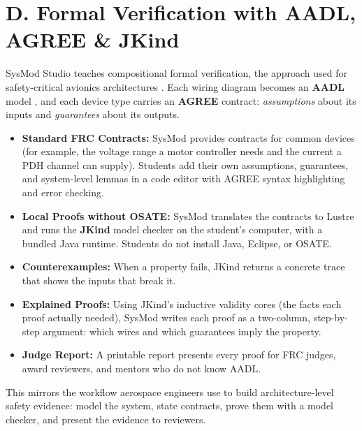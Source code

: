 \documentclass[11pt,letterpaper]{article}
\begin{document}
\newpage

\section*{\Large {D. Formal Verification with AADL, AGREE \& JKind}}\label{sec:D}
SysMod Studio teaches compositional formal verification, the approach used for safety-critical avionics architectures \cite{agree}. Each wiring diagram becomes an \textbf{AADL} model \cite{aadl}, and each device type carries an \textbf{AGREE} contract: \emph{assumptions} about its inputs and \emph{guarantees} about its outputs.

\begin{itemize}
    \item \textbf{Standard FRC Contracts:} SysMod provides contracts for common devices (for example, the voltage range a motor controller needs and the current a PDH channel can supply). Students add their own assumptions, guarantees, and system-level lemmas in a code editor with AGREE syntax highlighting and error checking.
    \item \textbf{Local Proofs without OSATE:} SysMod translates the contracts to Lustre and runs the \textbf{JKind} model checker \cite{jkind} on the student's computer, with a bundled Java runtime. Students do not install Java, Eclipse, or OSATE.
    \item \textbf{Counterexamples:} When a property fails, JKind returns a concrete trace that shows the inputs that break it.
    \item \textbf{Explained Proofs:} Using JKind's inductive validity cores (the facts each proof actually needed), SysMod writes each proof as a two-column, step-by-step argument: which wires and which guarantees imply the property.
    \item \textbf{Judge Report:} A printable report presents every proof for FRC judges, award reviewers, and mentors who do not know AADL.
\end{itemize}

This mirrors the workflow aerospace engineers use to build architecture-level safety evidence: model the system, state contracts, prove them with a model checker, and present the evidence to reviewers.

\needspace{8cm}
\end{document}
